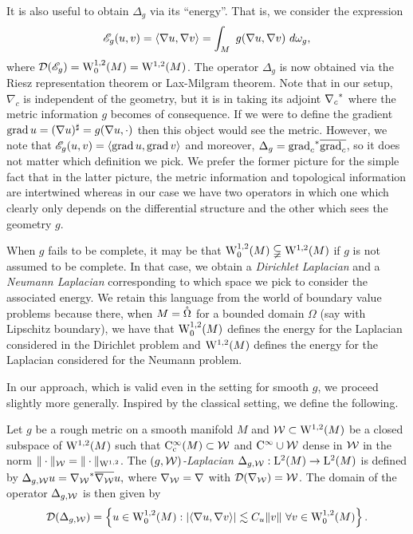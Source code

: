 \documentclass[a4paper, 12pt]{amsart}
\begin{document}
It is also useful to obtain $\Delta_g$ via its ``energy''. 
That is,  we consider the expression 
$$\sE_g(u,v) = \inprod{\nabla u, \nabla v} = \int_M\ g(\nabla u, \nabla v)\ d\omega_g,$$
where $\dom(\sE_g) = \SobH[0]{1}(M) = \SobH{1}(M)$.
The operator $\Delta_g$ is now obtained via the Riesz representation theorem
or Lax-Milgram theorem.
Note that in our setup, $\nabla_c$ is independent of the geometry,
but it is in taking its adjoint $\adj{\nabla_c}$ where the
metric information $g$ becomes of consequence. If we were
to define the gradient $\grad u =  (\nabla u)^\sharp = g(\nabla u, \cdot)$
then this object would see the metric. However,
we note that 
$\sE_g(u,v) = \inprod{\grad u, \grad v}$
and moreover, $\Delta_g = \adj{\grad_c} \close{\grad_c}$, 
so it does not matter which definition we pick.
We prefer the former picture for the
simple fact that in the latter picture, the metric information
and topological information are intertwined whereas 
in our case we have two operators in which one which clearly only depends
on the differential structure and the other which sees the geometry $g$.

When $g$ fails to be complete, it may be that  
$\SobH[0]{1}(M) \subsetneqq  \SobH{1}(M)$
if $g$ is not assumed to be complete. 
In that case, we obtain a \emph{Dirichlet Laplacian} and  a \emph{Neumann 
Laplacian} corresponding to which space we pick 
to consider the associated energy.
We retain this language from the world of boundary 
value problems because there, when $M = \interior\Omega$
for a bounded domain $\Omega$ (say with Lipschitz boundary), we have that
$\SobH[0]{1}(M)$ defines the energy for
the Laplacian considered in the Dirichlet problem
and $\SobH{1}(M)$ defines the energy 
for the Laplacian considered for the Neumann problem.

In our approach, which is valid even in the setting
for smooth $g$, we proceed slightly more generally. 
Inspired by the classical setting, we define
the following.
 
\begin{defn}[$(g,\cW)$-Laplacian]
Let \(g\) be a rough metric on a smooth manifold \(M\)
and $\cW \subset \SobH{1}(M)$ be a closed subspace
of $\SobH{1}(M)$ such that $\Ck[c]{\infty}(M) \subset \cW$
and $\Ck{\infty} \cup \cW$ dense in $\cW$ 
in the norm $\norm{\cdot}_{\cW} = \norm{\cdot}_{\SobH{1}}$. 
The \emph{$(g,\cW)$-Laplacian}
\(\Delta_{g,\cW} : \Lp{2}(M) \to \Lp{2}(M)\) is defined by
$\Delta_{g,\cW} u = \adj{\nabla_{\cW}} \close{ \nabla_{\cW}} u,$
where  $\nabla_{\cW} = \nabla$ with $\dom(\nabla_{\cW}) = \cW$. 
The domain of the operator $\Delta_{g,\cW}$ is then given by
$$\dom(\Delta_{g,\cW}) = \set{u \in \SobH[0]{1}(M): \modulus{\inprod{\nabla u, \nabla v}} \lesssim C_u \norm{v}\ \forall v \in \SobH[0]{1}(M)}.$$
\end{defn}
\end{document}
